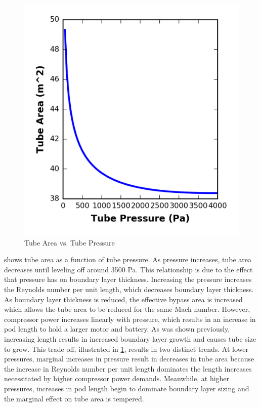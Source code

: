 \begin{figure}
	\centering
	\includegraphics[width=.45\textwidth]{../../images/graphs/pressure_trades/pressure_vs_Area.png}
	\caption{Tube Area vs. Tube Pressure}
	\label{fig:tube_area_vs_tube_press}
\end{figure}
 shows tube area as a function of tube pressure.
As pressure increases, tube area decreases until leveling off around 3500 Pa.
This relationship is due to the effect that pressure has on boundary layer thickness.
Increasing the pressure increases the Reynolds number per unit length,
which decreases boundary layer thickness. As boundary layer thickness is
reduced, the effective bypass area is increased which allows the tube area to
be reduced for the same Mach number. However, compressor power increases
linearly with pressure, which results in an increase in pod length to hold a
larger motor and battery. As was shown previously, increasing length results in
increased boundary layer growth and causes tube size to grow. This trade off,
illustrated in \cref{fig:tube_area_vs_tube_press}, results in two distinct trends.
At lower pressures, marginal increases in pressure result in decreases in tube
area because the increase in Reynolds number per unit length dominates the
length increases necessitated by higher compressor power demands. Meanwhile,
at higher pressures, increases in pod length begin to dominate boundary layer
sizing and the marginal effect on tube area is tempered.

